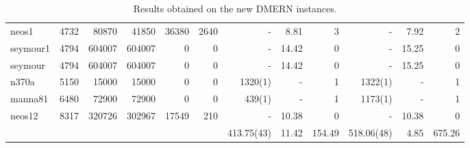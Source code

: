 \begin{sidewaystable}[Hp]
\begin{center}
\begin{tabular}{lrrrrr|rrr|rrr}
neos1	&	4732	&	80870	&	41850	&	36380	&	2640	&	-	&	8.81	&	3	&	-	&	7.92	&	2	\\
seymour1	&	4794	&	604007	&	604007	&	0	&	0	&	-	&	14.42	&	0	&	-	&	15.25	&	0	\\
seymour	&	4794	&	604007	&	604007	&	0	&	0	&	-	&	14.42	&	0	&	-	&	15.25	&	0	\\
n370a	&	5150	&	15000	&	15000	&	0	&	0	&	1320(1)	&	-	&	1	&	1322(1)	&	-	&	1	\\
manna81	&	6480	&	72900	&	72900	&	0	&	0	&	439(1)	&	-	&	1	&	1173(1)	&	-	&	1	\\
neos12	&	8317	&	320726	&	302967	&	17549	&	210	&	-	&	10.38	&	0	&	-	&	10.38	&	0	\\
\hline
	&		&		&		&		&		&	413.75(43)	&	11.42	&	154.49	&	518.06(48)	&	4.85	&	675.26	\\
\hline
\end{tabular}
\end{center}
\caption{\footnotesize Results obtained on the new DMERN instances.}
\label{resBC_NewDMERNInstances}
\normalsize
\end{sidewaystable}


